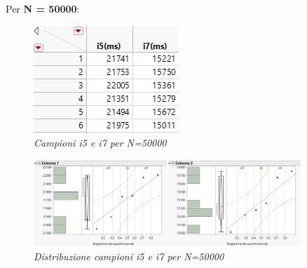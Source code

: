 Per \textbf{N = 50000}:
\begin{figure}[H]
	\centering
	\includegraphics{img/hw0/50000.png}
	\caption{\textit{Campioni i5 e i7 per N=50000}}
\end{figure}
\begin{figure}[H]
	\centering
	\includegraphics[width=0.9\textwidth]{img/hw0/50000distr.png}
	\caption{\textit{Distribuzione campioni i5 e i7 per N=50000}}
\end{figure}

